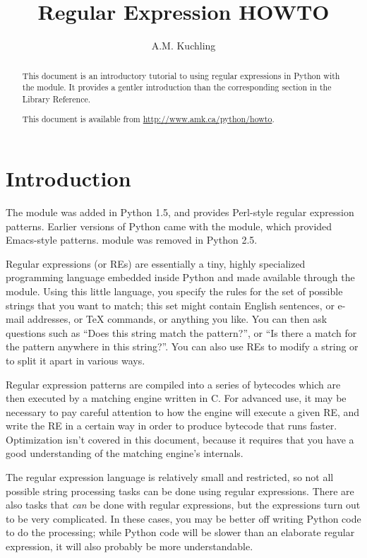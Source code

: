 \documentclass{howto}
\title{Regular Expression HOWTO}
\author{A.M. Kuchling}
\begin{document}
\maketitle

\begin{abstract}
\noindent
This document is an introductory tutorial to using regular expressions
in Python with the  module.  It provides a gentler
introduction than the corresponding section in the Library Reference.

This document is available from 
\url{http://www.amk.ca/python/howto}.

\end{abstract}

\tableofcontents

\section{Introduction}

The  module was added in Python 1.5, and provides
Perl-style regular expression patterns.  Earlier versions of Python
came with the  module, which provided Emacs-style
patterns.   module was removed in Python 2.5.

Regular expressions (or REs) are essentially a tiny, highly
specialized programming language embedded inside Python and made
available through the  module.  Using this little language,
you specify the rules for the set of possible strings that you want to
match; this set might contain English sentences, or e-mail addresses,
or TeX commands, or anything you like.  You can then ask questions
such as ``Does this string match the pattern?'', or ``Is there a match
for the pattern anywhere in this string?''.  You can also use REs to
modify a string or to split it apart in various ways.

Regular expression patterns are compiled into a series of bytecodes
which are then executed by a matching engine written in C.  For
advanced use, it may be necessary to pay careful attention to how the
engine will execute a given RE, and write the RE in a certain way in
order to produce bytecode that runs faster.  Optimization isn't
covered in this document, because it requires that you have a good
understanding of the matching engine's internals.

The regular expression language is relatively small and restricted, so
not all possible string processing tasks can be done using regular
expressions.  There are also tasks that \emph{can} be done with
regular expressions, but the expressions turn out to be very
complicated.  In these cases, you may be better off writing Python
code to do the processing; while Python code will be slower than an
elaborate regular expression, it will also probably be more understandable.
\end{document}
